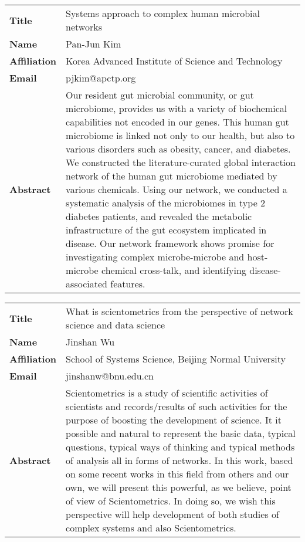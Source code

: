 \documentclass[oneside,A4paper,12pt]{article}
\begin{document}
\newpage
\begin{longtable}{p{2cm}p{14cm}}
\toprule
\textbf{Title} & Systems approach to complex human microbial networks\\
\textbf{Name} & Pan-Jun Kim\\
\textbf{Affiliation} & Korea Advanced Institute of Science and Technology\\
\textbf{Email} & pjkim@apctp.org\\
\textbf{Abstract} & Our resident gut microbial community, or gut microbiome, provides us with a variety of biochemical capabilities not encoded in our genes. This human gut microbiome is linked not only to our health, but also to various disorders such as obesity, cancer, and diabetes. We constructed the literature-curated global interaction network of the human gut microbiome mediated by various chemicals. Using our network, we conducted a systematic analysis of the microbiomes in type 2 diabetes patients, and revealed the metabolic infrastructure of the gut ecosystem implicated in disease. Our network framework shows promise for investigating complex microbe-microbe and host-microbe chemical cross-talk, and identifying disease-associated features.\\
\bottomrule
\end{longtable}

\newpage
\begin{longtable}{p{2cm}p{14cm}}
\toprule
\textbf{Title} & What is scientometrics from the perspective of network science and data science\\
\textbf{Name} & Jinshan Wu\\
\textbf{Affiliation} & School of Systems Science, Beijing Normal University\\
\textbf{Email} & jinshanw@bnu.edu.cn\\
\textbf{Abstract} & Scientometrics is a study of scientific activities of scientists and records/results of such activities for the purpose of boosting the development of science. It it possible and natural to represent the basic data, typical questions, typical ways of thinking and typical methods of analysis  all in forms of networks. In this work, based on some recent works in this field from others and our own, we will present this powerful, as we believe, point of view of Scientometrics. In doing so, we wish this perspective will help development of both studies of complex systems and also Scientometrics.\\
\bottomrule
\end{longtable}
\end{document}
